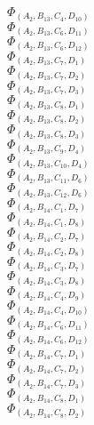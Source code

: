 \documentclass[14pt]{article}
\begin{document}
    $\Phi_{({A}_{2}, {B}_{13}, {C}_{4}, {D}_{10})}$ \\ 
    $\Phi_{({A}_{2}, {B}_{13}, {C}_{6}, {D}_{11})}$ \\ 
    $\Phi_{({A}_{2}, {B}_{13}, {C}_{6}, {D}_{12})}$ \\ 
    $\Phi_{({A}_{2}, {B}_{13}, {C}_{7}, {D}_{1})}$ \\ 
    $\Phi_{({A}_{2}, {B}_{13}, {C}_{7}, {D}_{2})}$ \\ 
    $\Phi_{({A}_{2}, {B}_{13}, {C}_{7}, {D}_{3})}$ \\ 
    $\Phi_{({A}_{2}, {B}_{13}, {C}_{8}, {D}_{1})}$ \\ 
    $\Phi_{({A}_{2}, {B}_{13}, {C}_{8}, {D}_{2})}$ \\ 
    $\Phi_{({A}_{2}, {B}_{13}, {C}_{8}, {D}_{3})}$ \\ 
    $\Phi_{({A}_{2}, {B}_{13}, {C}_{9}, {D}_{4})}$ \\ 
    $\Phi_{({A}_{2}, {B}_{13}, {C}_{10}, {D}_{4})}$ \\ 
    $\Phi_{({A}_{2}, {B}_{13}, {C}_{11}, {D}_{6})}$ \\ 
    $\Phi_{({A}_{2}, {B}_{13}, {C}_{12}, {D}_{6})}$ \\ 
    $\Phi_{({A}_{2}, {B}_{14}, {C}_{1}, {D}_{7})}$ \\ 
    $\Phi_{({A}_{2}, {B}_{14}, {C}_{1}, {D}_{8})}$ \\ 
    $\Phi_{({A}_{2}, {B}_{14}, {C}_{2}, {D}_{7})}$ \\ 
    $\Phi_{({A}_{2}, {B}_{14}, {C}_{2}, {D}_{8})}$ \\ 
    $\Phi_{({A}_{2}, {B}_{14}, {C}_{3}, {D}_{7})}$ \\ 
    $\Phi_{({A}_{2}, {B}_{14}, {C}_{3}, {D}_{8})}$ \\ 
    $\Phi_{({A}_{2}, {B}_{14}, {C}_{4}, {D}_{9})}$ \\ 
    $\Phi_{({A}_{2}, {B}_{14}, {C}_{4}, {D}_{10})}$ \\ 
    $\Phi_{({A}_{2}, {B}_{14}, {C}_{6}, {D}_{11})}$ \\ 
    $\Phi_{({A}_{2}, {B}_{14}, {C}_{6}, {D}_{12})}$ \\ 
    $\Phi_{({A}_{2}, {B}_{14}, {C}_{7}, {D}_{1})}$ \\ 
    $\Phi_{({A}_{2}, {B}_{14}, {C}_{7}, {D}_{2})}$ \\ 
    $\Phi_{({A}_{2}, {B}_{14}, {C}_{7}, {D}_{3})}$ \\ 
    $\Phi_{({A}_{2}, {B}_{14}, {C}_{8}, {D}_{1})}$ \\ 
    $\Phi_{({A}_{2}, {B}_{14}, {C}_{8}, {D}_{2})}$ \\ 
\end{document}
